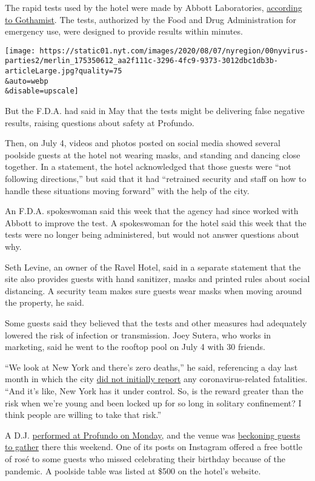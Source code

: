 The rapid tests used by the hotel were made by Abbott Laboratories,
\href{https://gothamist.com/arts-entertainment/profundo-ravel-covid-test-rooftop-pandemic-pool-parties-rage-lic}{according
to Gothamist}. The tests, authorized by the Food and Drug Administration
for emergency use, were designed to provide results within minutes.

\texttt{[image: https://static01.nyt.com/images/2020/08/07/nyregion/00nyvirus-parties2/merlin\_175350612\_aa2f111c-3296-4fc9-9373-3012dbc1db3b-articleLarge.jpg?quality=75\\\&auto=webp\\\&disable=upscale]}

But the F.D.A. had said in May that the tests might be delivering false
negative results, raising questions about safety at Profundo.

Then, on July 4, videos and photos posted on social media showed several
poolside guests at the hotel not wearing masks, and standing and dancing
close together. In a statement, the hotel acknowledged that those guests
were ``not following directions,'' but said that it had ``retrained
security and staff on how to handle these situations moving forward''
with the help of the city.

An F.D.A. spokeswoman said this week that the agency had since worked
with Abbott to improve the test. A spokeswoman for the hotel said this
week that the tests were no longer being administered, but would not
answer questions about why.

Seth Levine, an owner of the Ravel Hotel, said in a separate statement
that the site also provides guests with hand sanitizer, masks and
printed rules about social distancing. A security team makes sure guests
wear masks when moving around the property, he said.

Some guests said they believed that the tests and other measures had
adequately lowered the risk of infection or transmission. Joey Sutera,
who works in marketing, said he went to the rooftop pool on July 4 with
30 friends.

``We look at New York and there's zero deaths,'' he said, referencing a
day last month in which the city
\href{https://www.cnn.com/2020/07/13/health/new-york-city-coronavirus-zero-deaths/index.html}{did
not initially report} any coronavirus-related fatalities. ``And it's
like, New York has it under control. So, is the reward greater than the
risk when we're young and been locked up for so long in solitary
confinement? I think people are willing to take that risk.''

A D.J. \href{https://www.instagram.com/p/CDbmjr1Delp/}{performed at
Profundo on Monday}, and the venue was
\href{https://www.instagram.com/p/CDggXIED4Yn/}{beckoning guests to
gather} there this weekend. One of its posts on Instagram offered a free
bottle of rosé to some guests who missed celebrating their birthday
because of the pandemic. A poolside table was listed at \$500 on the
hotel's website.

